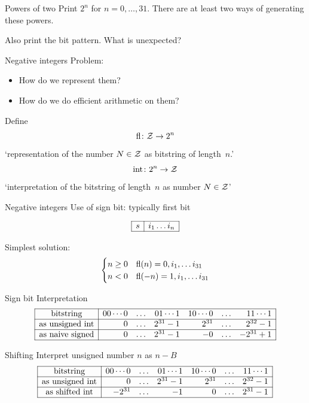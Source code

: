 \begin{exerciseframe}{Powers of two}
  \label{ex:two-powers}
  Print $2^n$ for $n=0,\ldots,31$. There are at least two ways of
  generating these powers.

  Also print the bit pattern. What is unexpected?
\end{exerciseframe}

\begin{numberedframe}{Negative integers}
  Problem:
  \begin{itemize}
  \item How do we represent them?
  \item How do we do efficient arithmetic on them?
  \end{itemize}
  Define
  \[ \mathop{\mathrm{fl}}\colon {\cal Z}\rightarrow 2^n \]
  `representation of the number $N\in{\cal Z}$ as bitstring of length~$n$.'
  \[ \mathop{\mathrm{int}}\colon 2^n \rightarrow {\cal Z} \]
  `interpretation of the bitstring of length~$n$ as number $N\in{\cal Z}$'
\end{numberedframe}

\begin{numberedframe}{Negative integers}
Use of sign bit: typically first bit

\[
\begin{array}{|r|r|}
  \hline
  s&i_1\ldots i_n\\ \hline
\end{array}
\]

Simplest solution:
\[
\begin{cases}
  n\geq 0&\mathop{\mathrm{fl}}(n)= 0,i_1,\ldots i_{31}\\
  n<0& \mathop{\mathrm{fl}}(-n)= 1,i_1,\ldots i_{31}
\end{cases}
\]
\end{numberedframe}

\begin{numberedframe}{Sign bit}
  Interpretation
  \[
\begin{array}{|c|rrrrrr|}
  \hline
  \hbox{bitstring}&
  00\cdots0&\ldots&01\cdots1&
  10\cdots0&\ldots&11\cdots1\\ \hline
  \hbox{as unsigned int}&
  0&\ldots&2^{31}-1&
  2^{31}&\ldots&2^{32}-1\\ \hline
  \hbox{as naive signed}&
  0&\ldots&2^{31}-1&
  -0&\ldots&-2^{31}+1\\ \hline
\end{array}
\]
\end{numberedframe}

\begin{numberedframe}{Shifting}
Interpret unsigned number $n$ as $n-B$
\[
\begin{array}{|c|rrrrrr|}
  \hline
  \hbox{bitstring}&
  00\cdots0&\ldots&01\cdots1&
  10\cdots0&\ldots&11\cdots1\\ \hline
  \hbox{as unsigned int}&
  0&\ldots&2^{31}-1&
  2^{31}&\ldots&2^{32}-1\\ \hline
  \hbox{as shifted int}&
  -2^{31}&\ldots&-1&
  0&\ldots&2^{31}-1\\ \hline
\end{array}
\]
\end{numberedframe}

